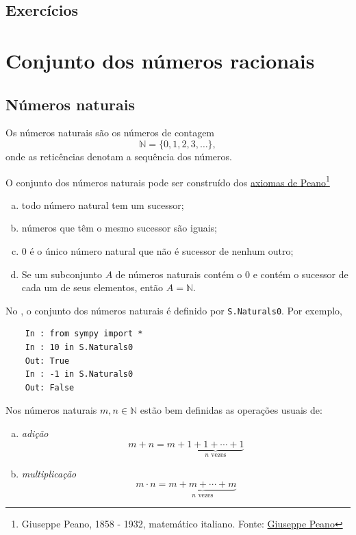 \subsection*{Exercícios}

\emconstrucao

\section{Conjunto dos números racionais}\label{cap_numreal_racionais}

\emconstrucao

\subsection{Números naturais}

Os números naturais são os números de contagem
\begin{equation}
  \mathbb{N} = \{0, 1, 2, 3, \ldots\},
\end{equation}
onde as reticências denotam a sequência dos números.

O conjunto dos números naturais pode ser construído dos \href{https://pt.wikipedia.org/wiki/Axiomas\_de\_Peano}{axiomas de Peano}\footnote{Giuseppe Peano, 1858 - 1932, matemático italiano. Fonte: \href{https://pt.wikipedia.org/wiki/Giuseppe\_Peano}{Giuseppe Peano}}
\begin{enumerate}[a)]
\item todo número natural tem um sucessor;
\item números que têm o mesmo sucessor são iguais;
\item $0$ é o único número natural que não é sucessor de nenhum outro;
\item Se um subconjunto $A$ de números naturais contém o $0$ e contém o sucessor de cada um de seus elementos, então $A = \mathbb{N}$.
\end{enumerate}

\ifispython
\begin{obs}
  No \python, o conjunto dos números naturais é definido por \lstinline!S.Naturals0!. Por exemplo,
  \begin{lstlisting}
    In : from sympy import *
    In : 10 in S.Naturals0
    Out: True
    In : -1 in S.Naturals0
    Out: False
  \end{lstlisting}
\end{obs}
\fi

Nos números naturais $m,n\in\mathbb{N}$ estão bem definidas as operações usuais de:
\begin{enumerate}[a)]
\item \emph{adição}
  \begin{equation}
    m+n = m + \underbrace{1 + 1 + \cdots + 1}_{n\text{ vezes}}
  \end{equation}
\item \emph{multiplicação}
  \begin{equation}
    m\cdot n = \underbrace{m + m + \cdots + m}_{n\text{ vezes}}
  \end{equation}
\end{enumerate}

